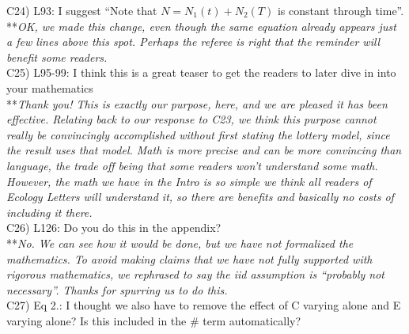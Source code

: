 \documentclass[letterpaper,11pt]{article}
\begin{document}
\noindent C24) L93: I suggest ``Note that $N = N_1(t) + N_2(T)$ is constant through time''. \\

\noindent ***\emph{OK, we made this change, even though the same equation already appears just a few lines
above this spot. Perhaps the referee is right that the reminder will benefit some readers.} \\

\noindent C25) L95-99: I think this is a great teaser to get the readers to later dive in into your mathematics \\

\noindent ***\emph{Thank you! This is exactly our purpose, here, and we are pleased it has been effective.
Relating back to our response to C23, we think this purpose cannot really be convincingly accomplished
without first stating the lottery model, since the result uses that model. Math is more precise and can be
more convincing than language, the trade off being that some readers won't understand some math. However, the 
math we have in the Intro is so simple we think all readers of Ecology Letters will understand it, so there are
benefits and basically no costs of including it there. } \\

\noindent C26) L126: Do you do this in the appendix? \\

\noindent ***\emph{No. We can see how it would be done, but we have not formalized the mathematics. 
To avoid making claims that we have not fully supported
with rigorous mathematics, we rephrased to say the iid assumption is 
``probably not necessary''. Thanks for spurring us to do this.} \\

\noindent C27) Eq 2.: I thought we also have to remove the effect of C varying alone and E varying alone? Is this included in the $\#$ term automatically? \\
\end{document}
